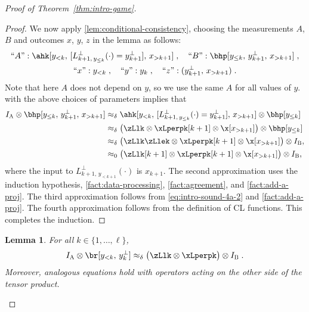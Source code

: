 \documentclass[11pt]{article}
\newtheorem{lemma}[theorem]{Lemma}
\theoremstyle{definition}
\newcommand{\Id}{\ensuremath{I}}
\newcommand{\ia}{\Id_\alice}
\newcommand{\ib}{\Id_\bob}
\newcommand{\labelstyle}[1]{\ensuremath{\textsc{#1}}\xspace}
\newcommand{\alice}{\labelstyle{A}}
\newcommand{\bob}{\labelstyle{B}}
\begin{document}
\begin{proof}[Proof of Theorem~\ref{thm:intro-game}]
\begin{proof}
    We now apply \cref{lem:conditional-consistency}, choosing the measurements
    $A$, $B$ and outcomes $x$, $y$, $z$ in the lemma as follows:
    \begin{gather*}
      \text{``$A$''}: \ahk[{y_{<k},\, [L^\perp_{k+1,\, y_{\le k}}(\cdot) =
          y^\perp_{k+1}],\, x_{>k+1}}]\;, \quad
      \text{``$B$''}: \bhp[y_{\le k},\, y^\perp_{k+1},\, x_{>k+1}]\;, \\
      \text{``$x$''}: y_{<k}\;, \quad
      \text{``$y$''}: y_k\;, \quad
      \text{``$z$''}: (y^\perp_{k+1},\, x_{>k+1})\;.
    \end{gather*}
		Note that here $A$ does not depend on $y$, so we use the same $A$ for all values of $y$. 
     with the above choices of parameters
    implies that
    \begin{equation*}
      \begin{split}
        \ia \otimes \bhp[y_{\le k},\, y^\perp_{k+1},\, x_{>k+1}]
        & \approx_\delta \ahk[{y_{<k},\, [L^\perp_{k+1,\, y_{\le k}}(\cdot) =
          y^\perp_{k+1}],\, x_{>k+1}}] \otimes \bhp[y_{\le k}]\\
        & \approx_\delta  \bigl( \zLlk \otimes \xLperpk[k+1] \otimes \x[x_{>k+1}]
        \bigr) \otimes \bhp[y_{\le k}]\\
        & \approx_\delta \bigl( \zLlk \zLlek \otimes \xLperpk[k+1] \otimes \x[x_{>k+1}]
        \bigr) \otimes \ib,\\
        & \approx_0 \bigl( \zLlk[k+1] \otimes \xLperpk[k+1] \otimes \x[x_{>k+1}]
        \bigr) \otimes \ib,
      \end{split}
    \end{equation*}
    where the input to $L^\perp_{k+1,\, y_{<k+1}}(\cdot)$ is $x_{k+1}$.
    The second approximation uses the induction hypothesis,
    \cref{fact:data-processing}, \cref{fact:agreement}, and
    \cref{fact:add-a-proj}.
    The third approximation follows from \cref{eq:intro-sound-4a-2} and
    \cref{fact:add-a-proj}.
    The fourth approximation follows from the definition of CL functions.
    This completes the induction.
  \end{proof}

  \begin{lemma}
    For all $k \in \{1, \ldots, \ell\}$,
	  \begin{equation}
      \label{eq:intro-sound-4}
      \ia \otimes \br[y_{<k},\, y_k^\perp] \approx_\delta
      \bigl( \zLlk \otimes \xLperpk \bigr) \otimes \ib \;.
    \end{equation}
    Moreover, analogous equations hold with operators acting on the other side
    of the tensor product.
  \end{lemma}


\end{proof}
\end{document}
